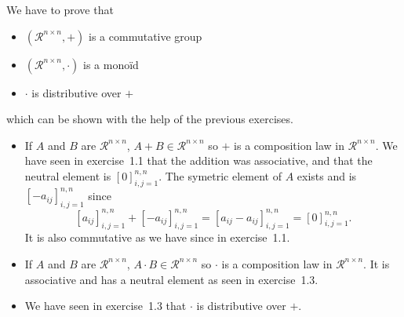 \begin{solution}
  We have to prove that
  \begin{itemize}
    \item $(\mathcal{R}^{n \times n}, +)$ is a commutative group
    \item $(\mathcal{R}^{n \times n}, \cdot)$ is a monoïd
    \item $\cdot$ is distributive over $+$
  \end{itemize}
  which can be shown with the help of the previous exercises.
  \begin{itemize}
    \item If $A$ and $B$ are $\mathcal{R}^{n \times n}$, $A+B \in \mathcal{R}^{n \times n}$
      so $+$ is a composition law in $\mathcal{R}^{n \times n}$.
      We have seen in exercise~1.1 that the addition was associative, and that the neutral element is
      $[0]_{i,j=1}^{n,n}$.
      The symetric element of $A$ exists and is $[-a_{ij}]_{i,j=1}^{n,n}$ since
      \[ [a_{ij}]_{i,j=1}^{n,n} + [-a_{ij}]_{i,j=1}^{n,n} = [a_{ij}-a_{ij}]_{i,j=1}^{n,n} = [0]_{i,j=1}^{n,n}. \]
      It is also commutative as we have since in exercise~1.1.
    \item If $A$ and $B$ are $\mathcal{R}^{n \times n}$, $A \cdot B \in \mathcal{R}^{n \times n}$
      so $\cdot$ is a composition law in $\mathcal{R}^{n \times n}$.
      It is associative and has a neutral element as seen in exercise~1.3.
    \item We have seen in exercise~1.3 that $\cdot$ is distributive over $+$.
  \end{itemize}
\end{solution}

